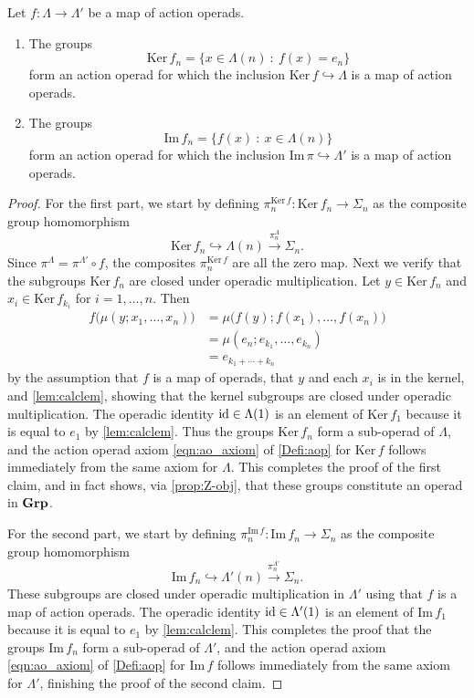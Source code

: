 \begin{prop}\label{prop:im-and-ker-aop}
Let $f \colon \Lambda \to \Lambda'$ be a map of action operads.
\begin{enumerate}
\item The groups
  \[
    \mathrm{Ker}\,f_n = \{x \in \Lambda(n)~\colon~f(x) = e_{n} \}
  \]
form an action operad for which the inclusion $\mathrm{Ker}\,f \hookrightarrow \Lambda$ is a map of action operads.
\item The groups
  \[
    \mathrm{Im}\,f_n = \{f(x)~\colon~x \in \Lambda(n)\}
  \]
form an action operad for which the inclusion $\mathrm{Im}\,\pi \hookrightarrow \Lambda'$ is a map of action operads.
\end{enumerate}
\end{prop}
\begin{proof}
For the first part, we start by defining $\pi_n^{\mathrm{Ker}\,f} \colon \mathrm{Ker}\,f_n \to \Sigma_n$ as the composite group homomorphism
\[
\mathrm{Ker}\,f_n \hookrightarrow \Lambda(n) \stackrel{\pi_n^{\Lambda}}{\to} \Sigma_n.
\]
Since $\pi^{\Lambda} = \pi^{\Lambda'} \circ f$, the composites $\pi_n^{\mathrm{Ker}\,f}$ are all the zero map.
Next we verify that the subgroups $\mathrm{Ker}\,f_n$ are closed under operadic multiplication. 
Let $y \in \mathrm{Ker}\,f_n$ and $x_i \in \mathrm{Ker}\,f_{k_i}$ for $i=1, \ldots, n$.
Then
\begin{align*}
f \big( \mu(y; x_1, \ldots, x_n) \big) & = \mu\big( f(y); f(x_1), \ldots, f(x_n) \big) \\
& = \mu(e_n; e_{k_1}, \ldots, e_{k_n} ) \\ 
& = e_{k_1 + \cdots + k_n}
\end{align*}
by the assumption that $f$ is a map of operads, that $y$ and each $x_i$ is in the kernel, and \cref{lem:calclem}, showing that the kernel subgroups are closed under operadic multiplication.
The operadic identity $\textrm{id} \in \Lambda(1)$ is an element of $\mathrm{Ker}\,f_1$ because it is equal to $e_1$ by \cref{lem:calclem}.
Thus the groups $\mathrm{Ker}\,f_n$ form a sub-operad of $\Lambda$, and the action operad axiom \cref{eqn:ao_axiom} of \cref{Defi:aop} for $\mathrm{Ker}\,f$ follows immediately from the same axiom for $\Lambda$.
This completes the proof of the first claim, and in fact shows, via \cref{prop:Z-obj}, that these groups constitute an operad in $\mathbf{Grp}$.

For the second part, we start by defining $\pi_n^{\mathrm{Im}\,f} \colon \mathrm{Im}\,f_n \to \Sigma_n$ as the composite group homomorphism
\[
\mathrm{Im}\,f_n \hookrightarrow \Lambda'(n) \stackrel{\pi_n^{\Lambda'}}{\to} \Sigma_n.
\]
These subgroups are closed under operadic multiplication in $\Lambda'$ using that $f$ is a map of action operads.
The operadic identity $\textrm{id} \in \Lambda'(1)$ is an element of $\mathrm{Im}\,f_1$ because it is equal to $e_1$ by \cref{lem:calclem}.
This completes the proof that the groups $\mathrm{Im}\,f_n$ form a sub-operad of $\Lambda'$, and the action operad axiom \cref{eqn:ao_axiom} of \cref{Defi:aop} for $\mathrm{Im}\,f$ follows immediately from the same axiom for $\Lambda'$, finishing the proof of the second claim.
\end{proof}


